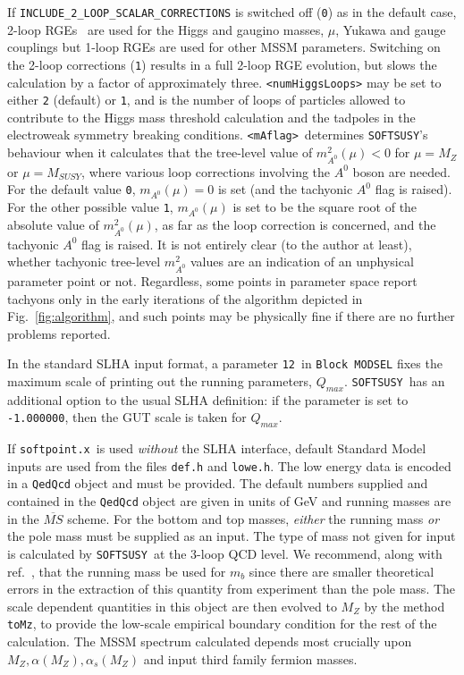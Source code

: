 \documentclass[]{article}
\def\SOFTSUSY{{\tt SOFTSUSY}}
\def\code#1{\small{\tt #1}\normalsize}
\begin{document}
If \code{INCLUDE\_2\_LOOP\_SCALAR\_CORRECTIONS} is switched off (\code{0}) as
in the default case, 
2-loop RGEs~\cite{mandv}
 are used for the Higgs and gaugino masses, $\mu$, Yukawa and gauge
couplings but  
1-loop RGEs are used for other MSSM parameters. Switching on the 2-loop
corrections (\code{1})
results in a full 2-loop RGE evolution, but slows the calculation by a factor
of approximately three.
\code{<numHiggsLoops>} may be set to either \code{2} (default) or \code{1},
and is the number of loops of particles allowed to contribute to the Higgs
mass threshold calculation and the tadpoles in the electroweak symmetry
breaking conditions.
\code{<mAflag>}~determines \SOFTSUSY's behaviour when it calculates that the
tree-level value of $m_{A^0}^2(\mu)<0$ for $\mu=M_Z$ or $\mu=M_{SUSY}$, where
various loop corrections involving the 
$A^0$ boson are needed. For the default value \code{0}, $m_{A^0}(\mu)=0$ is
set (and the tachyonic $A^0$ flag is raised). For the other possible value
\code{1}, $m_{A^0}(\mu)$ is set to be the square root of the absolute value of
$m_{A^0}^2(\mu)$, as far as the loop correction is concerned, and the
tachyonic $A^0$ flag is raised. It is not entirely clear (to the author at
least), whether tachyonic tree-level $m_{A^0}^2$ values are an indication of
an unphysical parameter point or not. Regardless, some points in parameter
space report tachyons only in the 
early iterations of the algorithm depicted in Fig.~\ref{fig:algorithm},
 and such points may
be physically fine if there are no further problems reported. 

In the standard SLHA input format, a parameter 
\code{12}~in \code{Block MODSEL} fixes the maximum scale of printing out the
running parameters, $Q_{max}$. \SOFTSUSY~has an additional option to the usual SLHA
definition: if the parameter is set to \code{-1.000000}, then the GUT scale is
taken for $Q_{max}$.

If \code{softpoint.x}~is used {\em without}\/ the SLHA interface, default
Standard Model inputs are used from the files \code{def.h} and \code{lowe.h}.
The low energy data is encoded in a \code{QedQcd} object and must be
provided. 
The default numbers supplied and contained in the \code{QedQcd} object 
are given in units of
GeV and running masses are in the $\overline{MS}$ scheme. 
For the bottom and
top masses, {\em either}\/ the running mass {\em 
  or}\/ the pole mass must be supplied as an input. The type of mass not given
for input is  calculated
by \SOFTSUSY~at the 3-loop QCD level. We recommend, along with
ref.~\cite{bottomMass}, that the
running mass be used for $m_b$ since there are smaller theoretical errors in
the 
extraction of this quantity from experiment than the pole mass. 
The scale dependent quantities in this object are then evolved to $M_Z$ by 
the method \code{toMz}, to provide the low-scale empirical boundary condition
for the rest of the calculation. The MSSM spectrum calculated depends most
crucially upon $M_Z, \alpha(M_Z), \alpha_s(M_Z)$ and input third family
fermion masses.
\end{document}
